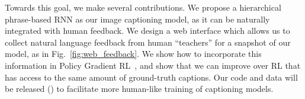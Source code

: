 
Towards this goal, we make several contributions. We propose a hierarchical phrase-based RNN as our image captioning model, as it can be naturally integrated with human feedback. We design a web interface which allows us to collect natural language feedback from human ``teachers'' for a snapshot of our model, as in Fig.~\ref{fig:web_feedback}. We show how to incorporate this %
information in Policy Gradient RL~\cite{Selfcritical}, and show that we can improve over RL that has access to the same amount of ground-truth captions. %
Our code and data will be released ({}) to facilitate more human-like training of captioning models. 


